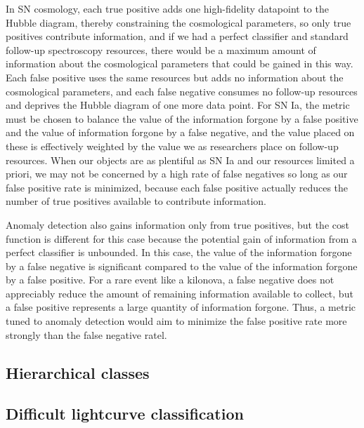 In SN cosmology, each true positive adds one high-fidelity datapoint to the Hubble diagram, thereby constraining the cosmological parameters, so only true positives contribute information, and if we had a perfect classifier and standard follow-up spectroscopy resources, there would be a maximum amount of information about the cosmological parameters that could be gained in this way.
Each false positive uses the same resources but adds no information about the cosmological parameters, and each false negative consumes no follow-up resources and deprives the Hubble diagram of one more data point.
For SN Ia, the metric must be chosen to balance the value of the information forgone by a false positive and the value of information forgone by a false negative, and the value placed on these is effectively weighted by the value we as researchers place on follow-up resources.
When our objects are as plentiful as SN Ia and our resources limited a priori, we may not be concerned by a high rate of false negatives so long as our false positive rate is minimized, because each false positive actually reduces the number of true positives available to contribute information.

Anomaly detection also gains information only from true positives, but the cost function is different for this case because the potential gain of information from a perfect classifier is unbounded.
In this case, the value of the information forgone by a false negative is significant compared to the value of the information forgone by a false positive.
For a rare event like a kilonova, a false negative does not appreciably reduce the amount of remaining information available to collect, but a false positive represents a large quantity of information forgone.
Thus, a metric tuned to anomaly detection would aim to minimize the false positive rate more strongly than the false negative ratel.

\subsection{Hierarchical classes}
\label{sec:hierarchical}

\subsection{Difficult lightcurve classification}
\label{sec:difficult}
